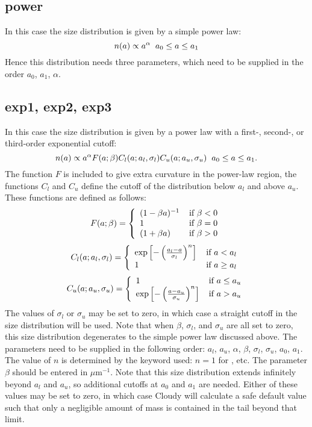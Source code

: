 \subsection{power}
In this case the size distribution is given by a simple power law:
\[ n(a) \propto a^\alpha \hspace{2mm} a_0 \leq a \leq a_1 \]
Hence this distribution needs three parameters, which need to be supplied
in the order $a_0$, $a_1$, $\alpha$.

\subsection{exp1, exp2, exp3}
In this case the size distribution is given by a power law with a first-,
second-, or third-order exponential cutoff:
\[ n(a) \propto a^\alpha F(a;\beta) C_l(a;a_l,\sigma_l) C_u(a;a_u,\sigma_u)
\hspace{2mm} a_0 \leq a \leq a_1. \] The function $F$ is included to give
extra curvature in the power-law region, the functions $C_l$ and $C_u$ define
the cutoff of the distribution below $a_l$ and above $a_u$. These functions
are defined as follows:
\[ F(a;\beta) = \left\{
	\begin{array}{l@{\hspace*{4mm}}l}
	    (1 - \beta a)^{-1} & \mbox{if } \beta < 0 \\
	     1 & \mbox{if } \beta = 0 \\
	    (1 + \beta a)      & \mbox{if } \beta > 0
        \end{array}
    \right.
\]
\[ C_l(a;a_l,\sigma_l) = \left\{
        \begin{array}{l@{\hspace*{4mm}}l}
	    \exp \left[ - \left( \frac{a_l - a}{\sigma_l} \right)^n \right] & \mbox{if } a < a_l \\
	    1 & \mbox{if } a \geq a_l
        \end{array}
     \right.
\]
\[ C_u(a;a_u,\sigma_u) = \left\{
        \begin{array}{l@{\hspace*{4mm}}l}
	    1 & \mbox{if } a \leq a_u \\
	    \exp \left[ - \left( \frac{a - a_u}{\sigma_u} \right)^n \right] & \mbox{if } a > a_u
        \end{array}
     \right.
\]
The values of $\sigma_l$ or $\sigma_u$ may be set to zero, in which case a
straight cutoff in the size distribution will be used. Note that when $\beta$,
$\sigma_l$, and $\sigma_u$ are all set to zero, this size distribution
degenerates to the simple power law discussed above. The parameters need to be
supplied in the following order: $a_l$, $a_u$, $\alpha$, $\beta$, $\sigma_l$,
$\sigma_u$, $a_0$, $a_1$. The value of $n$ is determined by the keyword used:
$n=1$ for , etc. The parameter $\beta$ should be entered
in $\mu$m$^{-1}$. Note that this size distribution extends
infinitely beyond $a_l$ and $a_u$, so additional cutoffs at $a_0$ and $a_1$
are needed. Either of these values may be set to zero, in which case Cloudy
will calculate a safe default value such that only a negligible amount of mass
is contained in the tail beyond that limit.
